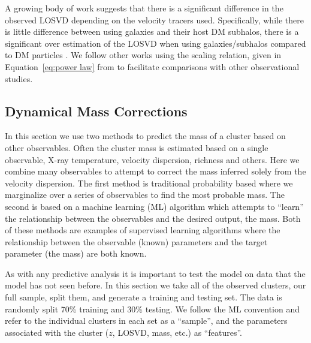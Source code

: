\documentclass[fleqn,usenatbib]{mnras}
\newcommand{\editorial}[1]{\textcolor{red}{#1}}
\begin{document}
A growing body of work suggests that there is a significant difference in the observed LOSVD depending on the velocity tracers used. Specifically, while there is little difference between using galaxies and their host DM subhalos, there is a significant over estimation of the LOSVD when using galaxies/subhalos compared to DM particles \citep{Munari2013}. We follow other works  using the scaling relation, given in Equation~\ref{eq:power law} from \cite{Munari2013} to facilitate comparisons with other observational studies. 

\subsection{Dynamical Mass Corrections}
In this section we use two methods to predict the mass of a cluster based on other observables. Often the cluster mass is estimated based on a single observable, X-ray temperature, velocity dispersion, richness and others. Here we combine many observables to attempt to correct the mass inferred solely from the velocity dispersion. The first method is traditional probability based where we marginalize over a series of observables to find the most probable mass. The second is based on a machine learning (ML) algorithm which attempts to ``learn'' the relationship between the observables and the desired output, the mass. Both of these methods are examples of supervised learning algorithms where the relationship between the observable (known) parameters and the target parameter (the mass) are both known.

As with any predictive analysis it is important to test the model on data that the model has not seen before. In this section we take all of the observed clusters, our full sample, split them, and generate a training and testing set. The data is randomly split 70\% training and 30\% testing. We follow the ML convention and refer to the individual clusters in each set as a ``sample'', and the parameters associated with the cluster ($z$, LOSVD, mass, etc.) as ``features''.  
\end{document}
